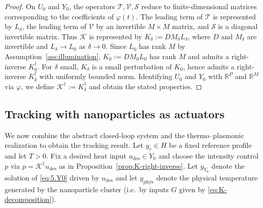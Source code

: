 \documentclass[11pt,a4paper]{article}
\numberwithin{equation}{section}
\theoremstyle{definition}
\newcommand{\R}{\mathbb{R}}
\newcommand{\1}{\mathbbm{1}}
\begin{document}
\begin{proof}
On $U_0$ and $Y_0$, the operators $\mathcal{T},\mathcal{V},\mathcal{S}$
reduce to finite-dimensional matrices corresponding to the coefficients of
$\varphi(t)$. The leading term of $\mathcal{T}$ is represented by $L_\delta$,
the leading term of $\mathcal{V}$ by an invertible $M\times M$ matrix, and
$\mathcal{S}$ is a diagonal invertible matrix. Thus $\mathcal{K}$ is
represented by $K_\delta:=D M_\delta L_\delta$, where $D$ and $M_\delta$
are invertible and $L_\delta\to L_0$ as $\delta\to0$. Since $L_0$ has rank
$M$ by Assumption~\ref{ass:illumination}, $K_0:=DM_0L_0$ has rank $M$ and
admits a right-inverse $K_0^\dagger$. For $\delta$ small, $K_\delta$ is a
small perturbation of $K_0$, hence admits a right-inverse $K_\delta^\dagger$
with uniformly bounded norm. Identifying $U_0$ and $Y_0$ with $\R^P$ and
$\R^M$ via $\varphi$, we define $\mathcal{K}^\dagger:=K_\delta^\dagger$ and
obtain the stated properties.
\end{proof}

\subsection{Tracking with nanoparticles as actuators}
\label{subsec:tracking-nano}
\noindent
We now combine the abstract closed-loop system and the thermo–plasmonic realization to obtain the tracking result.
\noindent
Let $y_r \in H$ be a fixed reference profile and let $T>0$.
Fix a desired heat input $u_{\mathrm{des}}\in Y_0$ and choose the intensity control $p$ via
$p=\mathcal{K}^\dagger u_{\mathrm{des}}$ as in Proposition~\ref{prop:K-right-inverse}.
Let $y_{Y_0}$ denote the solution of \eqref{eq:5.Y0} driven by $u_{\mathrm{des}}$ and let
$y_{\mathrm{phys}}$ denote the physical temperature generated by the nanoparticle cluster
(i.e.\ by inputs $G$ given by \eqref{eq:K-decomposition}).
\end{document}
